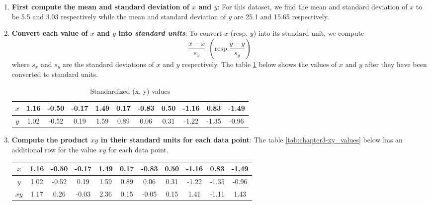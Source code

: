 \documentclass[math,code]{amznotes}
\theoremstyle{remark}
\begin{document}
\begin{enumerate}
    \item \textbf{First compute the mean and standard deviation of $x$ and $y$}: For this dataset, we find the mean and standard deviation of $x$ to be 5.5 and 3.03 respectively while the mean and standard deviation of $y$ are 25.1 and 15.65 respectively.
    \item \textbf{Convert each value of $x$ and $y$ into \textit{standard units}}: To convert $x$ (resp. $y$) into its standard unit, we compute
    \begin{equation}
        \frac{x-\bar{x}}{s_x}~~(\text{resp.}\frac{y-\bar{y}}{s_y})
    \end{equation}
    where $s_x$ and $s_y$ are the standard deviations of $x$ and $y$ respectively. The table \ref{tab:chapter3-standardized_values} below shows the values of $x$ and $y$ after they have been converted to standard units.
    \begin{table}[h]
        \centering
        \renewcommand{\arraystretch}{1.2} %
        \begin{tabular}{|c|c|c|c|c|c|c|c|c|c|c|}
        \hline
        $x$ & 1.16 & -0.50 & -0.17 & 1.49 & 0.17 & -0.83 & 0.50 & -1.16 & 0.83 & -1.49 \\
        \hline
        $y$ & 1.02 & -0.52 & 0.19 & 1.59 & 0.89 & 0.06 & 0.31 & -1.22 & -1.35 & -0.96 \\
        \hline
        \end{tabular}
        \caption{Standardized (x, y) values}
        \label{tab:chapter3-standardized_values}
    \end{table}
    \item \textbf{Compute the product $xy$ in their standard units for each data point}: The table \ref{tab:chapter3-xy_values} below has an additional row for the value $xy$ for each data point.
    \begin{table}[h]
        \centering
        \renewcommand{\arraystretch}{1.2} %
        \begin{tabular}{|c|c|c|c|c|c|c|c|c|c|c|}
        \hline
        $x$  & 1.16  & -0.50  & -0.17  & 1.49  & 0.17  & -0.83  & 0.50  & -1.16  & 0.83  & -1.49  \\
        \hline
        $y$  & 1.02  & -0.52  & 0.19  & 1.59  & 0.89  & 0.06  & 0.31  & -1.22  & -1.35  & -0.96  \\
        \hline
        $xy$ & 1.17  & 0.26   & -0.03  & 2.36  & 0.15  & -0.05  & 0.15  & 1.41   & -1.11  & 1.43   \\

\end{tabular}
\end{table}
\end{enumerate}
\end{document}
